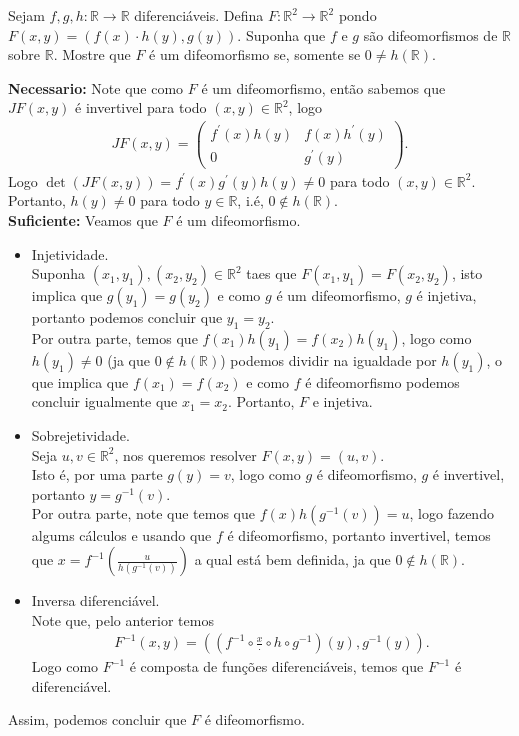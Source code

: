 \begin{homeworkProblem}[Seção 1-3]
  Sejam $f,g,h:\mathbb{R}\to\mathbb{R}$ diferenciáveis. Defina $F:\mathbb{R}^{2}\to\mathbb{R}^{2}$ pondo $F(x,y)=(f(x)\cdot h(y),g(y))$. Suponha que $f$ e $g$ são difeomorfismos de $\mathbb{R}$ sobre $\mathbb{R}$. Mostre que $F$ é um difeomorfismo se, somente se $0\neq h(\mathbb{R})$. 
  \begin{solution}
    \textbf{Necessario:} Note que como $F$ é um difeomorfismo, então sabemos que $JF(x,y)$ é invertivel para todo $(x,y)\in\mathbb{R}^{2}$, logo
    \begin{align*}
      JF(x,y)=\begin{pmatrix}
        f^{\prime}(x)h(y) & f(x)h^{\prime}(y) \\
        0 & g^{\prime}(y)
      \end{pmatrix}.
    \end{align*}
    Logo $\det(JF(x,y))=f^{\prime}(x)g^{\prime}(y)h(y)\neq 0$ para todo $(x,y)\in\mathbb{R}^{2}$. Portanto, $h(y)\neq 0$ para todo $y\in\mathbb{R}$, i.é, $0\notin h(\mathbb{R})$.\\
    \textbf{Suficiente:} Veamos que $F$ é um difeomorfismo.\\
    \begin{itemize}
      \item Injetividade.\\
        Suponha $(x_1,y_1),(x_2,y_2)\in\mathbb{R}^{2}$ taes que $F(x_1,y_1)=F(x_2,y_2)$, isto implica que $g(y_1)=g(y_2)$ e como $g$ é um difeomorfismo, $g$ é injetiva, portanto podemos concluir que $y_1=y_2$.\\
        Por outra parte, temos que $f(x_1)h(y_1)=f(x_2)h(y_1)$, logo como $h(y_1)\neq 0$ (ja que $0\notin h(\mathbb{R})$) podemos dividir na igualdade por $h(y_1)$, o que implica que $f(x_1)=f(x_2)$ e como $f$ é difeomorfismo podemos concluir igualmente que $x_1=x_2$. Portanto, $F$ e injetiva.
      \item Sobrejetividade.\\
        Seja $u,v\in\mathbb{R}^{2}$, nos queremos resolver $F(x,y)=(u,v)$.\\
        Isto é, por uma parte $g(y)=v$, logo como $g$ é difeomorfismo, $g$ é invertivel, portanto $y=g^{-1}(v)$.\\
        Por outra parte, note que temos que $f(x)h(g^{-1}(v))=u$, logo fazendo algums cálculos e usando que $f$ é difeomorfismo, portanto invertivel, temos que $x=f^{-1}\left( \frac{u}{h(g^{-1}(v))} \right)$ a qual está bem definida, ja que $0\notin h(\mathbb{R})$.\\
      \item Inversa diferenciável.\\
        Note que, pelo anterior temos
        \begin{align*}
          F^{-1}(x,y)=\left( \left(f^{-1}\circ \frac{x}{\cdot}\circ h\circ g^{-1}\right)(y),g^{-1}(y) \right).
        \end{align*}
        Logo como $F^{-1}$ é composta de funções diferenciáveis, temos que $F^{-1}$ é diferenciável. 
    \end{itemize}
    Assim, podemos concluir que $F$ é difeomorfismo. 
  \end{solution}
\end{homeworkProblem}
